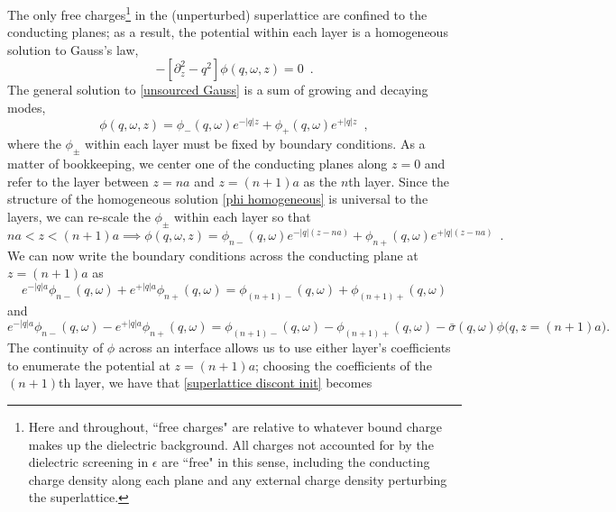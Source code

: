 \documentclass{article}
\newcommand{\lb}{\left[}
\newcommand{\rb}{\right]}
\newcommand{\e}{\epsilon}
\begin{document}
The only free charges\footnote{Here and throughout, ``free charges" are relative to whatever bound charge makes up the dielectric background.  All charges not accounted for by the dielectric screening in $\e$ are ``free" in this sense, including the conducting charge density along each plane and any external charge density perturbing the superlattice.} in the (unperturbed) superlattice are confined to the conducting planes; as a result, the potential within each layer is a homogeneous solution to Gauss's law,
\begin{equation}
    \label{unsourced Gauss}
    -\lb\partial_z^2-q^2\rb\phi(q,\omega,z) = 0
    \,\,\,.
\end{equation}
The general solution to \eqref{unsourced Gauss} is a sum of growing and decaying modes,
\begin{equation}
    \label{phi homogeneous}
    \phi(q,\omega,z) = \phi_-(q,\omega) e^{-|q|z} + \phi_+(q,\omega) e^{+|q|z}
    \,\,\,,
\end{equation}
where the $\phi_\pm$ within each layer must be fixed by boundary conditions.  As a matter of bookkeeping, we center one of the conducting planes along $z=0$ and refer to the layer between $z=na$ and $z=(n+1)a$ as the $n$th layer.  Since the structure of the homogeneous solution \eqref{phi homogeneous} is universal to the layers, we can re-scale the $\phi_{\pm}$ within each layer so that
\begin{equation}
    \label{nth layer phi}
    na<z<(n+1)a\implies
    \phi(q,\omega,z) = \phi_{n-}(q,\omega) e^{-|q|(z-na)} + \phi_{n+}(q,\omega)e^{+|q|(z-na)}
    \,\,\,.
\end{equation}
We can now write the boundary conditions across the conducting plane at $z=(n+1)a$ as
\begin{equation}
    \label{superlattice cont init}
    e^{-|q|a} \phi_{n-}(q,\omega) + e^{+|q|a}\phi_{n+}(q,\omega) = 
    \phi_{(n+1)-}(q,\omega)+\phi_{(n+1)+}(q,\omega)
\end{equation}
and
\begin{equation}
    \label{superlattice discont init}
    e^{-|q|a} \phi_{n-}(q,\omega) - e^{+|q|a}\phi_{n+}(q,\omega) = 
    \phi_{(n+1)-}(q,\omega)-\phi_{(n+1)+}(q,\omega)
    -
    \bar\sigma(q,\omega)\phi\big(q,z=(n+1)a\big)
    .
\end{equation}
The continuity of $\phi$ across an interface allows us to use either layer's coefficients to enumerate the potential at $z=(n+1)a$; choosing the coefficients of the $(n+1)$th layer, we have that \eqref{superlattice discont init} becomes
\end{document}
